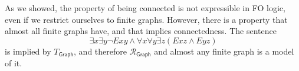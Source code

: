 As we showed, the property of being connected is not expressible in FO logic, even if we restrict ourselves to finite graphs. 
However, there is a property that almost all finite graphs have, and that implies connectedness. 
The sentence $$\exists x \exists y \lnot Exy \land \forall x \forall y \exists z (Exz \land Eyz)$$ is implied by $T_{\mathsf{Graph}}$, and therefore $\mathcal{R}_{\mathsf{Graph}}$ and almost any finite graph is a model of it. 

\begin{comment}
It is a clear consequence of Lemma \ref{rigidity} that almost all finite graphs are rigid. 
However, $\mathcal{R}_{\mathsf{Graph}}$ is not rigid. 
In fact it is \textbf{homogeneous}: every isomorphism between finite induced subgraphs can be extended to an automorphism\footnote{$\Aut(\mathcal{R}_{\mathsf{Graph}})$, far from being trivial, is known to have size $2^{\aleph_0}$.}. 
Suppose that $p_0: \mathbf{a}_r \mapsto \mathbf{b}_r$ is an isomorphism between two finite induced subgraphs of $\mathcal{R}_{\mathsf{Graph}}$ and let $a_{r+1}$ be a distinct vertex of $\mathcal{R}_{\mathsf{Graph}}$. 
If $S$ is the set of vertices among $\mathbf{a}_r$  linked to $a_{r+1}$ and $T$ the set of vertices among $\mathbf{a}_r$ not linked to $a_{r+1}$, then by \ref{random} we can map $a_{r+1}$ to $b_{r+1}$ so that $b_{r+1}$ is linked to every vertex in $p_0(S)$ and not linked to every vertex of $p_0(T)$. Then applying Lemma \ref{partial_implies_iso} we obtain the desired result. 
\end{comment}
